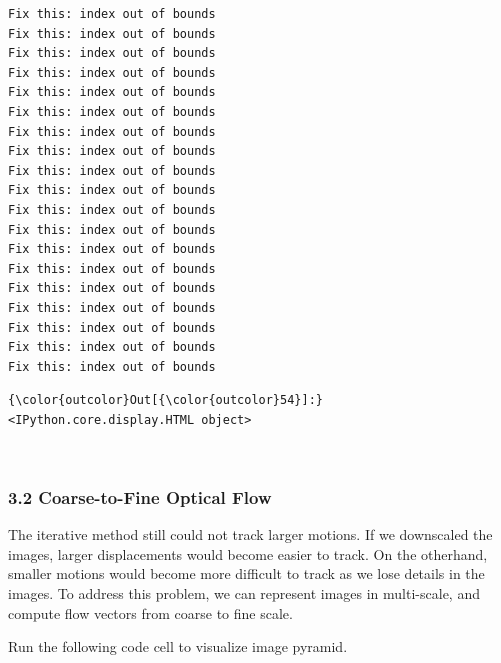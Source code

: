\documentclass[11pt]{article}
\begin{document}
    \begin{Verbatim}[commandchars=\\\{\}]
Fix this: index out of bounds
Fix this: index out of bounds
Fix this: index out of bounds
Fix this: index out of bounds
Fix this: index out of bounds
Fix this: index out of bounds
Fix this: index out of bounds
Fix this: index out of bounds
Fix this: index out of bounds
Fix this: index out of bounds
Fix this: index out of bounds
Fix this: index out of bounds
Fix this: index out of bounds
Fix this: index out of bounds
Fix this: index out of bounds
Fix this: index out of bounds
Fix this: index out of bounds
Fix this: index out of bounds
Fix this: index out of bounds

    \end{Verbatim}

\begin{Verbatim}[commandchars=\\\{\}]
{\color{outcolor}Out[{\color{outcolor}54}]:} <IPython.core.display.HTML object>
\end{Verbatim}
            
    \begin{center}
    \end{center}
    { \hspace*{\fill} \\}
    
    \hypertarget{coarse-to-fine-optical-flow}{%
\subsubsection{3.2 Coarse-to-Fine Optical
Flow}\label{coarse-to-fine-optical-flow}}

The iterative method still could not track larger motions. If we
downscaled the images, larger displacements would become easier to
track. On the otherhand, smaller motions would become more difficult to
track as we lose details in the images. To address this problem, we can
represent images in multi-scale, and compute flow vectors from coarse to
fine scale.

Run the following code cell to visualize image pyramid.
\end{document}
